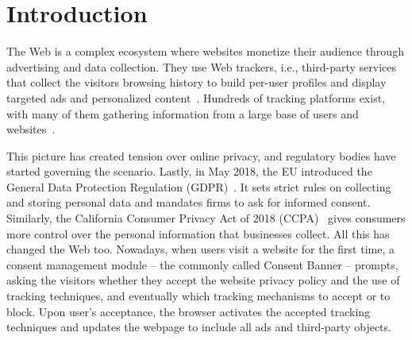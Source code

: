 \section{Introduction}
\label{sec:intro}

The Web is a complex ecosystem where websites monetize their audience through advertising and data collection. They use Web trackers, i.e., third-party services that collect the visitors browsing history to build per-user profiles and display targeted ads and personalized content~\cite{acar2014web,rizzo2021unveiling,papadogiannakis2021}.
Hundreds of tracking platforms exist, with many of them gathering information from a large base of users and websites~\cite{falahrastegar2014rise,metwalley2015online,pujol2015annoyed,iordanou2018tracing}.

This picture has created tension over online privacy, and regulatory bodies have started governing the scenario. 
Lastly, in May 2018, the EU introduced the General Data Protection Regulation (GDPR)~\cite{gpdr}. It sets strict rules on collecting and storing personal data and mandates firms to ask for informed consent. 
Similarly, the California Consumer Privacy Act of 2018 (CCPA)~\cite{ccpa} gives consumers more control over the personal information that businesses collect. All this has changed the Web too. Nowadays, when users visit a website for the first time, a consent management module -- the commonly called Consent Banner -- prompts, asking the visitors whether they accept the website privacy policy and the use of tracking techniques, and eventually which tracking mechanisms to accept or to block. Upon user's acceptance, the browser activates the accepted tracking techniques and updates the webpage to include all ads and third-party objects.

